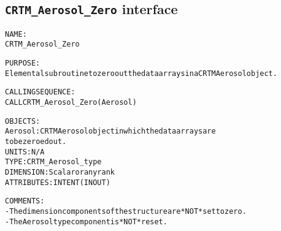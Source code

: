 \subsection{\texttt{CRTM\_Aerosol\_Zero} interface}
  \label{sec:CRTM_Aerosol_Zero_interface}
  \begin{alltt}
 
  NAME:
        CRTM_Aerosol_Zero
 
  PURPOSE:
        Elemental subroutine to zero out the data arrays in a CRTM Aerosol object.
 
  CALLING SEQUENCE:
        CALL CRTM_Aerosol_Zero( Aerosol )
 
  OBJECTS:
        Aerosol:       CRTM Aerosol object in which the data arrays are
                       to be zeroed out.
                       UNITS:      N/A
                       TYPE:       CRTM_Aerosol_type
                       DIMENSION:  Scalar or any rank
                       ATTRIBUTES: INTENT(IN OUT)
 
  COMMENTS:
        - The dimension components of the structure are *NOT* set to zero.
        - The Aerosol type component is *NOT* reset.
 
  \end{alltt}
